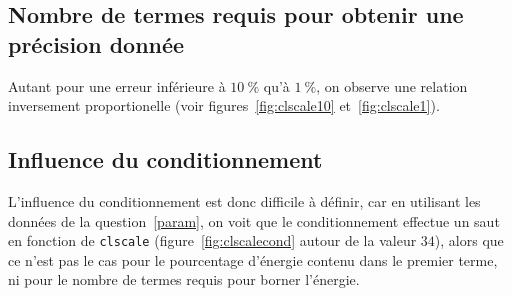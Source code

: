 \documentclass[11pt]{article}
\begin{document}
\subsection{Nombre de termes requis pour obtenir une précision donnée}
Autant pour une erreur inférieure à $\SI{10}{\percent}$ qu'à $\SI{1}{\percent}$, on observe une relation inversement proportionelle (voir figures~\ref{fig:clscale10} et~\ref{fig:clscale1}).

\subsection{Influence du conditionnement}
L'influence du conditionnement est donc difficile à définir, car en utilisant les données de la question~\ref{param}, on voit que le conditionnement effectue un saut en fonction de \texttt{clscale} (figure~\ref{fig:clscalecond} autour de la valeur $34$), alors que ce n'est pas le cas pour le pourcentage d'énergie contenu dans le premier terme, ni pour le nombre de termes requis pour borner l'énergie.

\appendix
\end{document}
